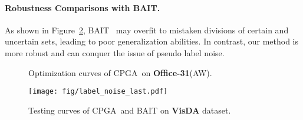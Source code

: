 \documentclass{article}
\def\ournet{CPGA}
\begin{document}
\paragraph{Robustness Comparisons with BAIT.} 
As shown in Figure~\ref{fig:noise}, BAIT~\cite{Yang2020UnsupervisedDA} may overfit to mistaken divisions of certain and uncertain sets, leading to poor generalization abilities.
In contrast, our method is more robust and can conquer the issue of pseudo label noise.

\begin{figure}[!h] 
\vspace{-0.1in}
\centering
\begin{minipage}{0.49\linewidth}
\end{minipage}
\begin{minipage}{0.49\linewidth}
\end{minipage}
\label{figdata}
\vspace{-0.1in}
\caption{Optimization curves of \ournet~on \textbf{Office-31}(AW).}
\label{vis:curve2}
\vspace{-0.05in}
\end{figure}


\begin{figure}[!h]
		\begin{center}
		\texttt{[image: fig/label\_noise\_last.pdf]}
		\vspace{-0.1in}
		\caption{Testing curves of \ournet~and BAIT on \textbf{VisDA} dataset.}
		\label{fig:noise}
		\end{center}
\vspace{-0.2in}
\end{figure}
\end{document}
